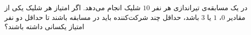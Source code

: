 \EXERCISE
در یک مسابقه‌ی تیراندازی هر نفر
$10$
شلیک انجام می‌دهد. اگر امتیاز هر شلیک یکی از مقادیر
$0$، $1$
یا
$3$
باشد، حداقل چند شرکت‌کننده باید در مسابقه باشند تا حداقل دو نفر امتیاز یکسانی داشته باشند؟